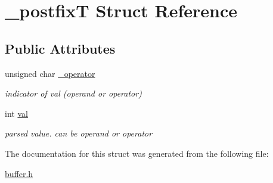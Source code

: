 \hypertarget{struct__postfixT}{}\section{\+\_\+postfixT Struct Reference}
\label{struct__postfixT}
\subsection*{Public Attributes}
\begin{DoxyCompactItemize}
\item 
\mbox{\label{struct__postfixT_a260ccf27bd661688706ae52a0b98bb72}} 
unsigned char \hyperlink{struct__postfixT_a260ccf27bd661688706ae52a0b98bb72}{\+\_\+operator}
\begin{DoxyCompactList}\small\item\em indicator of val (operand or operator) \end{DoxyCompactList}\item 
\mbox{\label{struct__postfixT_a24792160eddf33cb6f2e6a9b1e7945e4}} 
int \hyperlink{struct__postfixT_a24792160eddf33cb6f2e6a9b1e7945e4}{val}
\begin{DoxyCompactList}\small\item\em parsed value. can be operand or operator \end{DoxyCompactList}\end{DoxyCompactItemize}


The documentation for this struct was generated from the following file\+:\begin{DoxyCompactItemize}
\item 
\hyperlink{buffer_8h}{buffer.\+h}\end{DoxyCompactItemize}
